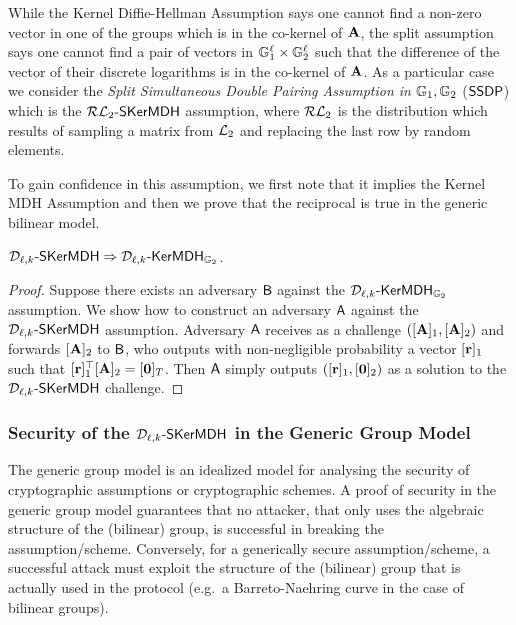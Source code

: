 While the Kernel Diffie-Hellman Assumption says one cannot find a non-zero vector in one of the groups which is in the co-kernel of $\mathbf{{A}}$, the split assumption says one cannot find a pair of vectors in $\mathbb{G}_1^{\ell} \times \mathbb{G}_2^{\ell}$ such that the difference of the vector of their discrete logarithms is in the co-kernel of $\mathbf{{A}}$. 
As a particular case we consider the \emph{Split Simultaneous Double Pairing Assumption in} $\mathbb{G}_1,\mathbb{G}_2$ ($\mathsf{SSDP}$) which is the $\mathcal{RL}_{2}\mbox{-}\mathsf{SKerMDH}$ assumption, where 
$\mathcal{RL}_{2}$ is the distribution which results of sampling a matrix from $\mathcal{L}_{2}$ and replacing the last row by random elements. 

To gain confidence in this assumption, we first note that it implies the Kernel MDH Assumption and then we prove that the reciprocal is true in the generic bilinear model. 

\begin{lemma} $\mathcal{D}_{\ell,k}\mbox{-}\mathsf{SKerMDH} \Rightarrow \mathcal{D}_{\ell,k}\mbox{-}\mathsf{KerMDH}_{\mathbb{G}_2}$.
\end{lemma}
\begin{proof} Suppose there exists an adversary $\mathsf{B}$ against the 
$\mathcal{D}_{\ell,k}\mbox{-}\mathsf{KerMDH}_{\mathbb{G}_2}$ assumption. We show how to construct an adversary $\mathsf{A}$ against the  $\mathcal{D}_{\ell,k}\mbox{-}\mathsf{SKerMDH}$ assumption. Adversary $\mathsf{A}$ receives as a challenge $([\mathbf{{A}}]_1,[\mathbf{{A}}]_2)$ and forwards $[\mathbf{{A}}]_2$ to $\mathsf{B}$, who outputs with non-negligible probability a vector $[\mathbf{r}]_1$ such that $[\mathbf{r}]_1^{\top} [\mathbf{{A}}]_2=[\mathbf{0}]_{T}$. Then $\mathsf{A}$  simply outputs $([\mathbf{r}]_1,[\mathbf{0}]_2)$ as a solution to the $\mathcal{D}_{\ell,k}\mbox{-}\mathsf{SKerMDH}$ challenge. 
\end{proof}

\subsubsection{Security of the $\mathcal{D}_{\ell,k}\mbox{-}\mathsf{SKerMDH}$ in the Generic Group Model}

The generic group model is an idealized model for analysing the security of cryptographic assumptions or cryptographic schemes. A proof of security in the generic group model guarantees that no attacker, that only uses the algebraic structure of the (bilinear) group, is successful in breaking the assumption/scheme. Conversely, for a generically secure assumption/scheme, a successful attack must exploit the structure of the (bilinear) group that is actually used in the protocol (e.g.~a Barreto-Naehring curve in the case of bilinear groups).  

